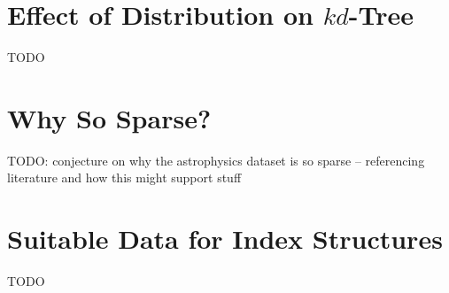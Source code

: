 \section{Effect of Distribution on $kd$-Tree}

TODO

\section{Why So Sparse?}

TODO: conjecture on why the astrophysics dataset is so sparse -- referencing literature and how this might support stuff

\section{Suitable Data for Index Structures}

TODO